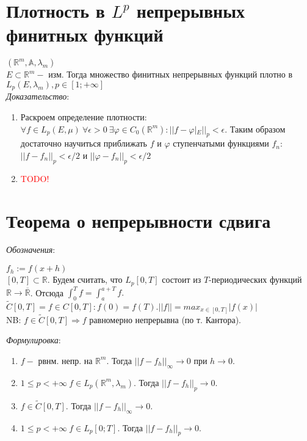 \documentclass[paper=a4, fontsize=17pt]{article}
\begin{document}
\section{Плотность в $L^p$ непрерывных финитных функций}
$(\mathbb{R}^m, \mathbb{A}, \lambda_m)$\\

$E \subset \mathbb{R}^m -$ изм. Тогда множество финитных непрерывных функций плотно в $L_p(E, \lambda_m), p \in [1; +\infty]$\\

\emph{Доказательство}:

\begin{enumerate}
	\item  Раскроем определение плотности: $\forall f \in L_p(E, \mu) \ \forall \epsilon > 0 \ \exists \varphi \in C_0(\mathbb{R}^m): ||f - \varphi|_E ||_p < \epsilon$. Таким образом достаточно научиться приближать $f$ и  $\varphi$ ступенчатыми функциями $f_n$: $||f-f_n||_p < \epsilon /2 $ и $||\varphi-f_n||_p < \epsilon /2 $

	\item	 \textcolor{red}{TODO!}

\end{enumerate}


\section{Теорема о непрерывности сдвига}
\emph{Обозначения}:

$f_h := f(x+h)$ \\
$[0, T] \subset \mathbb{R}$. Будем считать, что $L_p[0, T]$ состоит из $T$-периодических функций $\mathbb{R} \rightarrow \overline {\mathbb{R}}$. Отсюда $\int_{0}^{T} f = \int_{a}^{a+T} f.$ \\
$\widetilde{C}[0, T] = {f \in C[0, T]: f(0) = f(T) }. ||f|| = max_{x\in[0,T]}|f(x)|$ \\
NB: $f \in \widetilde{C}[0, T] \Rightarrow f$ равномерно непрерывна (по т. Кантора).

\emph{Формулировка}:
\begin{enumerate}
	\item $f - $ рвнм. непр. на $\mathbb{R}^m$. Тогда $||f-f_h||_\infty \rightarrow 0$ при $h\rightarrow 0$.
	\item $1 \leq p < + \infty \ f \in L_p(\mathbb{R}^m, \lambda_m)$. Тогда $||f-f_h||_p \rightarrow 0$.
	\item $f \in \widetilde{C}[0, T]$. Тогда $||f-f_h||_\infty \rightarrow 0$.
	\item $1 \leq p < + \infty \  f \in L_p[0; T]$. Тогда $||f-f_h||_p \rightarrow 0$.
\end{enumerate}
\end{document}
